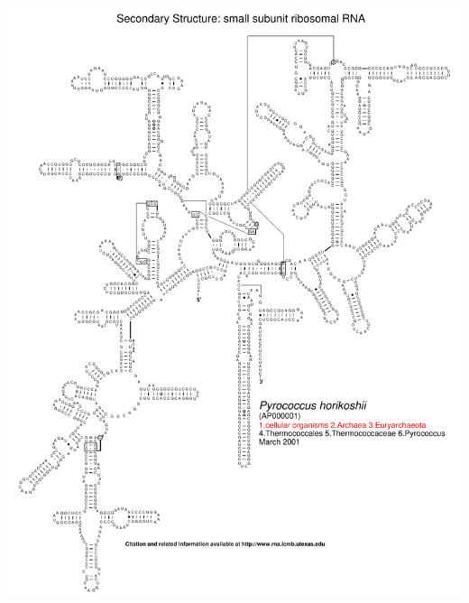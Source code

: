 \documentclass[landscape]{slides}
\begin{document}
\begin{slide}\begin{center}\includegraphics[height=8in]{figs/arc-17}\end{center}\vfill\end{slide}
\end{document}
